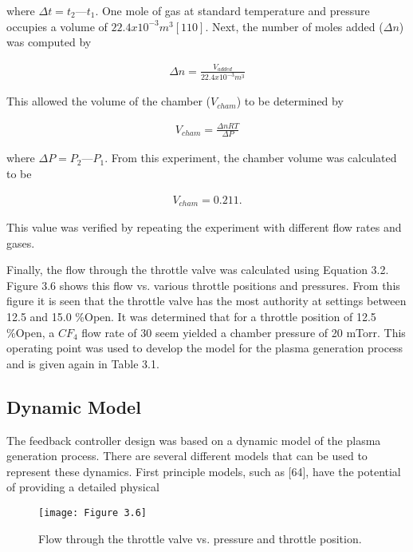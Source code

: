 \noindent where $\Delta t = t_{2} — t_{1}$. One mole of gas at standard temperature and pressure occupies a volume of $22.4 x 10^{-3}m^{3} [110]$. Next, the number of moles added ($\Delta n$) was computed by


\begin{align}
	\Delta n = \frac{V_{added}}{22.4 x 10^{-3}m^{3}}
\end{align}

\noindent This allowed the volume of the chamber ($V_{cham}$) to be determined by

\begin{align}
	V_{cham} = \frac{\Delta n RT}{\Delta P}
\end{align}

\noindent where $\Delta P = P_{2} — P_{1}$. From this experiment, the chamber volume was calculated to be

\begin{align}
	V_{cham} = 0.211.
\end{align}

\noindent This value was verified by repeating the experiment with different flow rates and gases.

Finally, the flow through the throttle valve was calculated using Equation 3.2. Figure 3.6 shows this flow vs. various throttle positions and pressures. From this figure it is seen that the throttle valve has the most authority at settings between 12.5 and 15.0 \%Open. It was determined that for a throttle position of 12.5 \%Open, a $CF_{4}$ flow rate of 30 seem yielded a chamber pressure of 20 mTorr. This operating point was used to develop the model for the plasma generation process and is given again in Table 3.1.

\subsection{Dynamic Model}

\tab The feedback controller design was based on a dynamic model of the plasma generation process. There are several different models that can be used to represent these dynamics. First principle models, such as [64], have the potential of providing a detailed physical


\begin{figure}[H]
	\centering
	\texttt{[image: Figure 3.6]}
	\bf\caption{  Flow through the throttle valve vs. pressure and throttle position.}
	\label{fig:3.6}
\end{figure}

